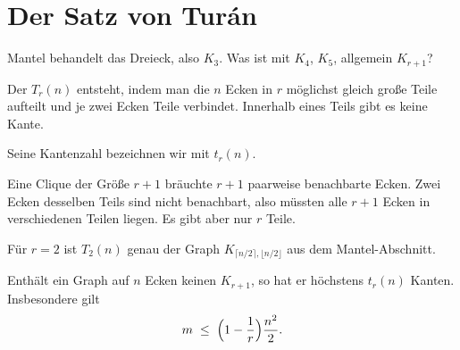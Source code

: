 \section{Der Satz von Turán}

Mantel behandelt das Dreieck, also $K_3$. Was ist mit $K_4$, $K_5$, allgemein $K_{r+1}$?

\begin{definition}
Der  $T_r(n)$ entsteht, indem man die $n$ Ecken in $r$ möglichst gleich große Teile aufteilt und je zwei Ecken  Teile verbindet. Innerhalb eines Teils gibt es keine Kante.

Seine Kantenzahl bezeichnen wir mit $t_r(n)$.
\end{definition}

\begin{merksatz}
Eine Clique der Größe $r+1$ bräuchte $r+1$ paarweise benachbarte Ecken. Zwei Ecken desselben Teils sind nicht benachbart, also müssten alle $r+1$ Ecken in verschiedenen Teilen liegen. Es gibt aber nur $r$ Teile.

\begin{center}
\end{center}

Für $r = 2$ ist $T_2(n)$ genau der Graph $K_{\lceil n/2\rceil, \lfloor n/2 \rfloor}$ aus dem Mantel-Abschnitt.
\end{merksatz}

\begin{merksatz}
Enthält ein Graph auf $n$ Ecken keinen $K_{r+1}$, so hat er höchstens $t_r(n)$ Kanten. Insbesondere gilt
\[ m \;\le\; \Bigl(1 - \frac{1}{r}\Bigr)\frac{n^2}{2} . \]
\end{merksatz}

